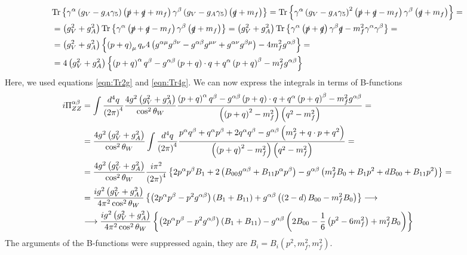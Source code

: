 \begin{align*}
& \mathrm{Tr} \left\lbrace \gamma^{\alpha} \left( g_V - g_A \gamma_5 \right) \left( \slashed{p}+\slashed{q}+m_f \right) \gamma^{\beta} \left( g_V - g_A \gamma_5 \right) \left( \slashed{q}+m_f \right) \right\rbrace = \mathrm{Tr} \left\lbrace \gamma^{\alpha} \left( g_V - g_A \gamma_5 \right)^2 \left( \slashed{p}+\slashed{q}-m_f \right) \gamma^{\beta} \left( \slashed{q}+m_f \right) \right\rbrace = & \\
& = \left( g_V^2 + g_A^2 \right) \mathrm{Tr} \left\lbrace \gamma^{\alpha} \left( \slashed{p} + \slashed{q} - m_f \right) \gamma^{\beta} \left( \slashed{q} + m_f \right) \right\rbrace = \left( g_V^2 + g_A^2 \right) \mathrm{Tr} \left\lbrace \gamma^{\alpha} \left( \slashed{p} + \slashed{q} \right) \gamma^{\beta} \slashed{q} - m^2_f \gamma^{\alpha}\gamma^{\beta} \right\rbrace = & \\
& = \left( g_V^2 + g_A^2 \right) \left\lbrace \left( p+q \right)_{\mu} q_{\nu} 4 \left( g^{\alpha\mu}g^{\beta\nu} - g^{\alpha\beta}g^{\mu\nu} + g^{\alpha\nu}g^{\beta\mu} \right) - 4m^2_f g^{\alpha\beta} \right\rbrace = & \\
& = 4 \left( g_V^2 + g_A^2 \right) \left\lbrace \left( p+q \right)^{\alpha}q^{\beta} - g^{\alpha\beta} \left( p+q \right) \cdot q + q^{\alpha} \left( p+q \right)^{\beta} - m^2_f g^{\alpha\beta} \right\rbrace &
\end{align*}
Here, we used equations \ref{eqn:Tr2g} and \ref{eqn:Tr4g}. We can now express the integrals in terms of B-functions
\begin{align*}
i\Pi^{\alpha\beta}_{ZZ} & = \int \frac{d^4q}{\left( 2\pi \right)^4} \frac{4g^2\left(g_V^2 + g_A^2 \right)}{\cos^2\theta_W} \frac{\left( p+q \right)^{\alpha}q^{\beta} - g^{\alpha\beta} \left( p+q \right) \cdot q + q^{\alpha} \left( p+q \right)^{\beta} - m^2_f g^{\alpha\beta}}{\left( \left( p+q \right)^2 -m^2_f \right) \left( q^2 - m^2_f \right)} = & \\
& = \frac{4g^2\left(g_V^2 + g_A^2 \right)}{\cos^2\theta_W} \int \frac{d^4q}{\left( 2\pi \right)^4} \frac{p^{\alpha}q^{\beta}+q^{\alpha}p^{\beta}+2q^{\alpha}q^{\beta} - g^{\alpha\beta} \left( m^2_f + q \cdot p + q^2 \right)}{\left( \left( p+q \right)^2 -m^2_f \right) \left( q^2 - m^2_f \right)} = & \\
& = \frac{4g^2\left(g_V^2 + g_A^2 \right)}{\cos^2\theta_W} \frac{i\pi^2}{\left( 2\pi \right)^4} \left\lbrace 2 p^{\alpha}p^{\beta} B_1 + 2 \left( B_{00} g^{\alpha\beta} + B_{11} p^{\alpha}p^{\beta} \right) - g^{\alpha\beta} \left( m^2_f B_0 + B_1 p^2 + d B_{00} + B_{11} p^2 \right) \right\rbrace = & \\
& = \frac{ig^2\left(g_V^2 + g_A^2 \right)}{4\pi^2\cos^2\theta_W} \left\lbrace \left( 2p^{\alpha}p^{\beta} -p^2 g^{\alpha\beta} \right) \left( B_1 + B_{11} \right) + g^{\alpha\beta} \left( \left( 2-d \right) B_{00} - m^2_f B_0  \right) \right\rbrace \longrightarrow & \\
& \longrightarrow \frac{ig^2\left(g_V^2 + g_A^2 \right)}{4\pi^2\cos^2\theta_W} \left\lbrace \left( 2p^{\alpha}p^{\beta} -p^2 g^{\alpha\beta} \right) \left( B_1 + B_{11} \right) - g^{\alpha\beta} \left( 2 B_{00} - \frac{1}{6} \left( p^2 - 6m^2_f \right) + m^2_f B_0  \right) \right\rbrace
\end{align*}
The arguments of the B-functions were suppressed again, they are $B_i = B_i(p^2,m^2_f,m^2_f)$. \\

